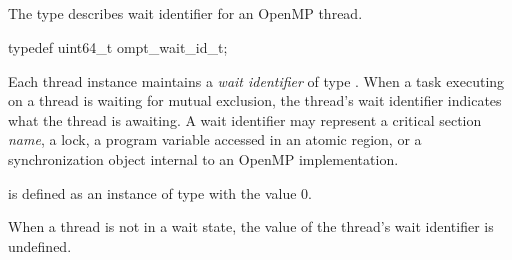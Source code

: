\subsection{}
\label{sec:ompt_wait_id_t}

\summary
The  type describes wait identifier for an OpenMP thread.

\format
\begin{ccppspecific}
\begin{omptOther}
typedef uint64_t ompt_wait_id_t;
\end{omptOther}
\end{ccppspecific}

\descr
Each thread instance maintains a \emph{wait identifier} of type 
. When a task executing on a thread is waiting 
for mutual exclusion, the thread's wait identifier indicates what the 
thread is awaiting. A wait identifier may represent a critical section 
{\em name}, a lock, a program variable accessed in an atomic region, or 
a synchronization object internal to an OpenMP implementation.

 is defined as an instance of type 
 with the value 0.

When a thread is not in a wait state, the value of the thread's wait 
identifier is undefined.

